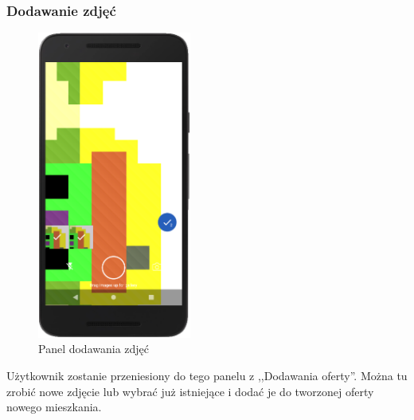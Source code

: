 \documentclass[polish, 11pt]{article}
\begin{document}
      \subsubsection{Dodawanie zdjęć}
        \begin{figure}[H]
                    \centering
                    \includegraphics[width=0.45\textwidth]{aplikacja/photo.png}
                    \caption{Panel dodawania zdjęć}
        \end{figure}
        
        Użytkownik zostanie przeniesiony do tego panelu z ,,Dodawania oferty''. Można tu zrobić nowe zdjęcie lub wybrać już istniejące i dodać je do tworzonej oferty nowego mieszkania.
        
\end{document}
